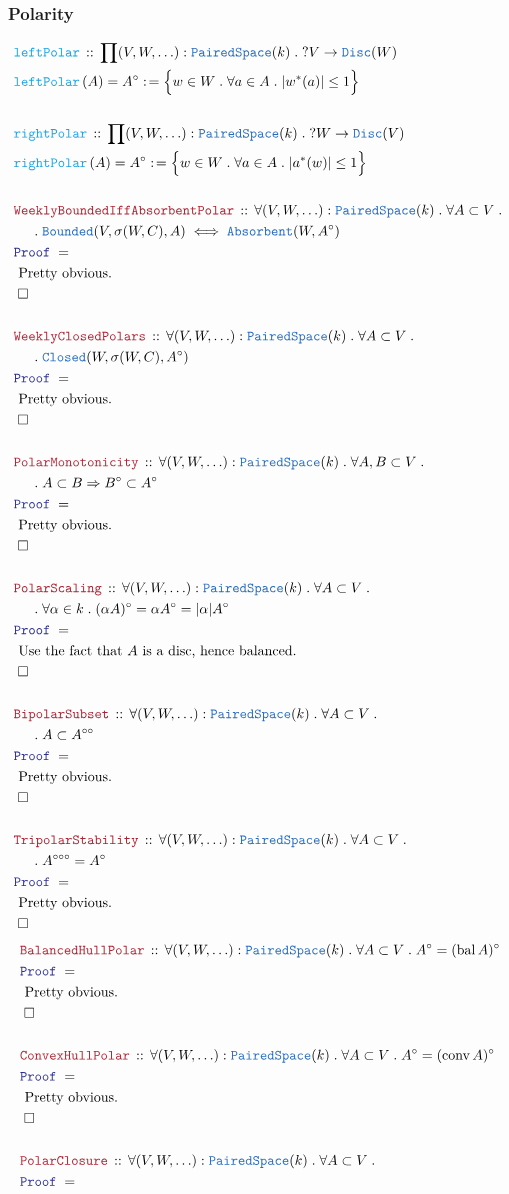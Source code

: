 \documentclass[12pt]{scrartcl}
\newcommand{\TYPE}[1]{\textcolor{NavyBlue}{\mathtt{#1}}}
\newcommand{\FUNC}[1]{\textcolor{Cerulean}{\mathtt{#1}}}
\newcommand{\LOGIC}[1]{\textcolor{Blue}{\mathtt{#1}}}
\newcommand{\THM}[1]{\textcolor{Maroon}{\mathtt{#1}}}
\renewcommand{\.}{\; . \;}
\newcommand{\de}{: \kern 0.1pc =}
\newcommand{\Act}[1]{\left( #1 \right)}
\newcommand{\Theorem}[2]{& \THM{#1} \, :: \, #2 \\ & \Proof = \\ }
\newcommand{\DeclareFunc}[2]{& \FUNC{#1} \, :: \, #2 \\}
\newcommand{\DefineNamedFunc}[4]{&  \FUNC{#1}\Act{#2} = #3 \de #4 \\}
\newcommand{\NewLine}{\\ & \kern 1pc}
\newcommand{\Page}[1]{ \begin{align*} #1 \end{align*}   }
\newcommand{\Explain}[1]{& \text{#1.} \\}
\newcommand{\Imply}{\Rightarrow}
\newcommand{\QED}{\; \square}
\newcommand{\EndProof}{& \QED \\}
\newcommand{\Proof}{\LOGIC{Proof} \; }
\DeclareMathOperator{\conv}{conv}
\newcommand{\PS}{\TYPE{PairedSpace}}
\DeclareMathOperator{\bal}{\mathrm{bal}}
\begin{document}
\subsubsection{Polarity}
\Page{
	\DeclareFunc{leftPolar}
	{
		\prod (V,W,\ldots) : \PS(k) \. ?V \to \TYPE{Disc}(W)
	}
	\DefineNamedFunc{leftPolar}{A}{A^\circ}{\Big\{ w \in W \. \forall a \in A \. |w^*(a)| \le 1\Big\}}
	\\
	\DeclareFunc{rightPolar}
	{
		\prod (V,W,\ldots) : \PS(k) \. ?W \to \TYPE{Disc}(V)
	}
	\DefineNamedFunc{rightPolar}{A}{A^\circ}{\Big\{ w \in W \. \forall a \in A \. |a^*(w)| \le 1\Big\}}
	\\
	\Theorem{WeeklyBoundedIffAbsorbentPolar}
	{
		\forall (V,W,\ldots) : \PS(k) \. 
		\forall A \subset V \. \NewLine \.
		\TYPE{Bounded}(V,\sigma(W,C),A)
		\iff
		\TYPE{Absorbent}(W,A^\circ)
	}
	\Explain{ Pretty obvious}
	\EndProof
	\\
	\Theorem{WeeklyClosedPolars}
	{
		\forall (V,W,\ldots) : \PS(k) \. 
		\forall A \subset V \. \NewLine \.
		\TYPE{Closed}(W,\sigma(W,C),A^\circ)
	}
	\Explain{ Pretty obvious}
	\EndProof
	\\
	\Theorem{PolarMonotonicity}
	{
		\forall (V,W,\ldots) : \PS(k) \. 
		\forall A,B \subset V \. \NewLine \.
		A \subset B \Imply B^\circ \subset A^\circ
	}
	\Explain{ Pretty obvious}
	\EndProof
	\\
	\Theorem{PolarScaling}
	{
		\forall (V,W,\ldots) : \PS(k) \. 
		\forall A \subset V \. \NewLine \.
		\forall \alpha \in k \.
		(\alpha A)^\circ = \alpha A^\circ  = |\alpha| A^\circ
	}
	\Explain{ Use the fact that $A$ is a disc, hence balanced}
	\EndProof
	\\
	\Theorem{BipolarSubset}
	{
		\forall (V,W,\ldots) : \PS(k) \. 
		\forall A \subset V \. \NewLine \.
		A \subset A^{\circ \circ}
	}
	\Explain{ Pretty obvious}
	\EndProof
	\\	
	\Theorem{TripolarStability}
	{
		\forall (V,W,\ldots) : \PS(k) \. 
		\forall A \subset V \. \NewLine \.
		A^{\circ \circ \circ} = A^{\circ}
	}
	\Explain{ Pretty obvious}
	\EndProof
}\Page{
	\Theorem{BalancedHullPolar}
	{
		\forall  (V,W,\ldots) : \PS(k) \.
		\forall  A \subset V \.
		A^\circ = (\bal A)^\circ
	}
	\Explain{ Pretty obvious}
	\EndProof
	\\
	\Theorem{ConvexHullPolar}
	{
		\forall  (V,W,\ldots) : \PS(k) \.
		\forall  A \subset V \.
		A^\circ = (\conv A)^\circ
	}
	\Explain{ Pretty obvious}
	\EndProof
	\\
	\Theorem{PolarClosure}
	{
		\forall  (V,W,\ldots) : \PS(k) \.
		\forall  A \subset V \.
}}
\end{document}
